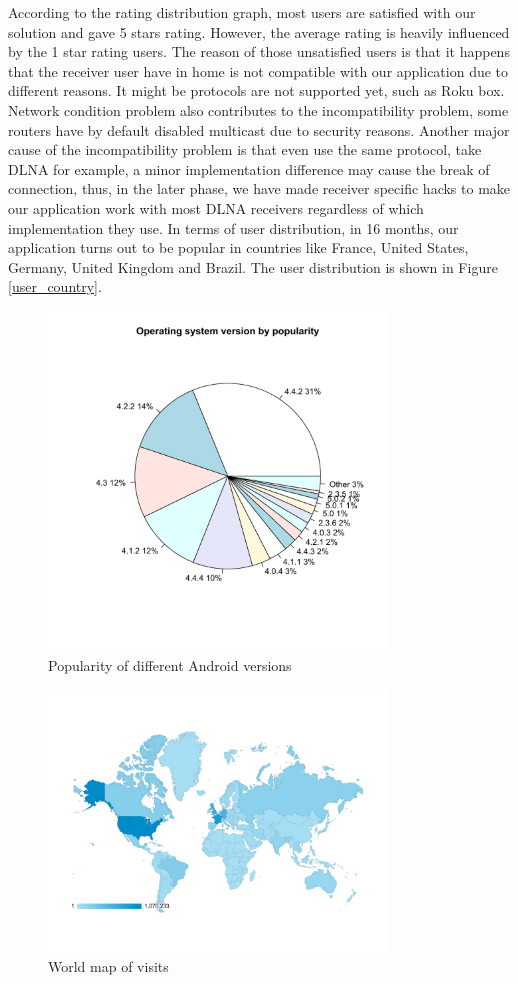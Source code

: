 According to the rating distribution graph, most users are satisfied with our solution and gave 5 stars rating. However, the average rating is heavily influenced by the 1 star rating users. The reason of those unsatisfied users is that it happens that the receiver user have in home is not compatible with our application due to different reasons. It might be protocols are not supported yet, such as Roku box. Network condition problem also contributes to the incompatibility problem, some routers have by default disabled multicast due to security reasons. Another major cause of the incompatibility problem is that even use the same protocol, take DLNA for example, a minor implementation difference may cause the break of connection, thus, in the later phase, we have made receiver specific hacks to make our application work with most DLNA receivers regardless of which implementation they use.
In terms of user distribution, in 16 months, our application turns out to be popular in countries like France, United States, Germany, United Kingdom and Brazil. The user distribution is shown in Figure \ref{user_country}.
\begin{figure}[htb]
\centering \includegraphics[height=9cm]{charts/os_version_popularity}
\caption{Popularity of different Android versions \label{os_versions}}
\end{figure}

\begin{figure}[htb]
\centering \includegraphics[width=9cm]{charts/session_world_map}
\caption{World map of visits \label{user_map}}
\end{figure}

